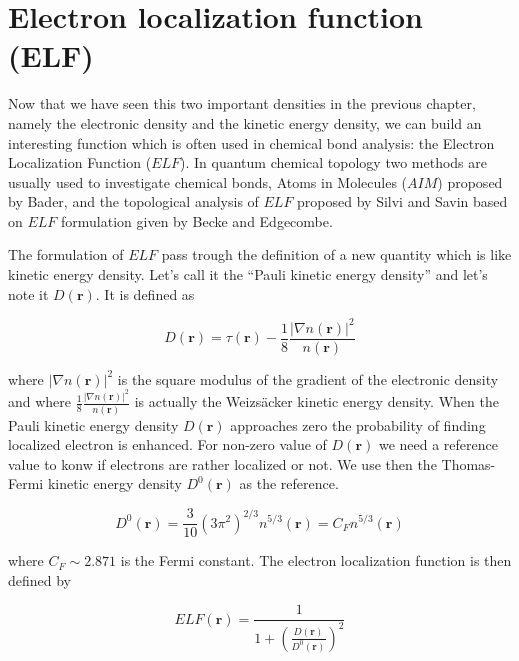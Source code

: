 \documentclass[a4paper,12pt]{report}
\begin{document}
\chapter{Electron localization function (ELF)}
\label{chapter3}

Now that we have seen this two important densities in the previous chapter, namely the electronic density and the kinetic energy density, we can build an interesting function which is often used in chemical bond analysis: the Electron Localization Function ($ELF$). In quantum chemical topology two methods are usually used to investigate chemical bonds, Atoms in Molecules ($AIM$) proposed by Bader, and the topological analysis of $ELF$ proposed by Silvi and Savin based on $ELF$ formulation given by Becke and Edgecombe.

The formulation of $ELF$ pass trough the definition of a new quantity which is like kinetic energy density. Let's call it the ``Pauli kinetic energy density'' and let's note it $D(\mathbf{r})$. It is defined as


\begin{equation}
D(\mathbf{r}) = \tau(\mathbf{r}) - \frac{1}{8} \frac{\vert \nabla n(\mathbf{r}) \vert^2}{n(\mathbf{r})} \label{eqD}
\end{equation}

where $\vert \nabla n(\mathbf{r}) \vert^2$ is the square modulus of the gradient of the electronic density and where $\frac{1}{8} \frac{\vert \nabla n(\mathbf{r}) \vert^2}{n(\mathbf{r})}$ is actually the Weizs\"{a}cker kinetic energy density. When the Pauli kinetic energy density $D(\mathbf{r})$ approaches zero the probability of finding localized electron is enhanced. For non-zero value of $D(\mathbf{r})$ we need a reference value to konw if electrons are rather localized or not. We use then the Thomas-Fermi kinetic energy density $D^{0}(\mathbf{r})$ as the reference.

\begin{equation}
D^{0}(\mathbf{r}) = \frac{3}{10} \left(3\pi^2 \right)^{2/3} n^{5/3}(\mathbf{r}) = C_F n^{5/3}(\mathbf{r}) \label{eqD0}
\end{equation}

where $C_F\sim2.871$ is the Fermi constant. The electron localization function is then defined by

\begin{equation}
ELF(\mathbf{r}) = \frac{1}{1+\left( \frac{D(\mathbf{r})}{D^{0}(\mathbf{r})}\right)^2 } \label{eqELF}
\end{equation}
\end{document}
